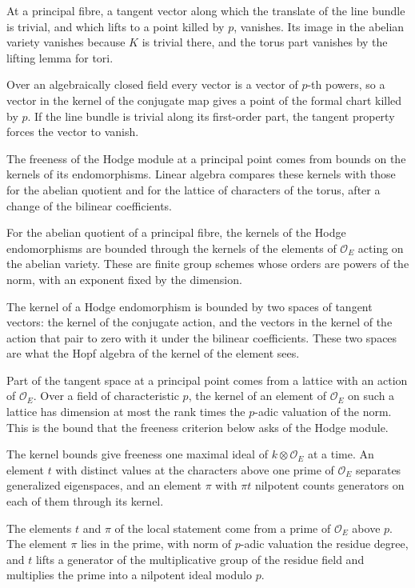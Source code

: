 At a principal fibre, a tangent vector along which the translate of the line bundle is trivial, and which
lifts to a point killed by $p$, vanishes. Its image in the abelian variety vanishes because $K$ is trivial
there, and the torus part vanishes by the lifting lemma for tori.

Over an algebraically closed field every vector is a vector of $p$-th powers, so a vector in the kernel of
the conjugate map gives a point of the formal chart killed by $p$. If the line bundle is trivial along its
first-order part, the tangent property forces the vector to vanish.

The freeness of the Hodge module at a principal point comes from bounds on the kernels of its
endomorphisms. Linear algebra compares these kernels with those for the abelian quotient and for the
lattice of characters of the torus, after a change of the bilinear coefficients.

For the abelian quotient of a principal fibre, the kernels of the Hodge endomorphisms are bounded
through the kernels of the elements of $\mathcal O_E$ acting on the abelian variety. These are finite
group schemes whose orders are powers of the norm, with an exponent fixed by the dimension.

The kernel of a Hodge endomorphism is bounded by two spaces of tangent vectors: the kernel of the
conjugate action, and the vectors in the kernel of the action that pair to zero with it under the
bilinear coefficients. These two spaces are what the Hopf algebra of the kernel of the element sees.

Part of the tangent space at a principal point comes from a lattice with an action of $\mathcal O_E$.
Over a field of characteristic $p$, the kernel of an element of $\mathcal O_E$ on such a lattice has
dimension at most the rank times the $p$-adic valuation of the norm. This is the bound that the
freeness criterion below asks of the Hodge module.

The kernel bounds give freeness one maximal ideal of $k\otimes\mathcal O_E$ at a time. An element $t$
with distinct values at the characters above one prime of $\mathcal O_E$ separates generalized
eigenspaces, and an element $\pi$ with $\pi t$ nilpotent counts generators on each of them through its
kernel.

The elements $t$ and $\pi$ of the local statement come from a prime of $\mathcal O_E$ above $p$. The
element $\pi$ lies in the prime, with norm of $p$-adic valuation the residue degree, and $t$ lifts a
generator of the multiplicative group of the residue field and multiplies the prime into a nilpotent
ideal modulo $p$.

